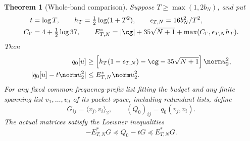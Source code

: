 \documentclass[11pt,a4paper]{article}
\numberwithin{equation}{section}
\newtheorem{theorem}{Theorem}[section]
\theoremstyle{definition}\newtheorem{definition}[theorem]{Definition}
\theoremstyle{remark}\newtheorem{remark}[theorem]{Remark}
\begin{document}
\begin{theorem}[Whole-band comparison]\label{sw:thm:aggregate}
Suppose $T\ge\max(1,2b_N)$, and put
\begin{equation}\label{sw:eq:aggregate-constants}
 \begin{split}
 t&=\log T,\qquad h_T=\tfrac12\log(1+T^2),\qquad
 \epsilon_{T,N}=16b_N^2/T^2,\\
 C_\Gamma&=4+\tfrac12\log37,\qquad
 E^*_{T,N}=|\cg|+35\sqrt{N+1}+\max(C_\Gamma,\epsilon_{T,N}h_T).
 \end{split}
\end{equation}
Then
\begin{align}
 q_0[u]&\ge\left[h_T(1-\epsilon_{T,N})-\cg-35\sqrt{N+1}\right]\norm u_2^2,\label{sw:eq:aggregate-lower}\\
 |q_0[u]-t\norm u_2^2|&\le E^*_{T,N}\norm u_2^2.\label{sw:eq:aggregate-error}
\end{align}
For any fixed common frequency-prefix list fitting the budget and any finite spanning list $v_1,\ldots,v_d$ of its packet space, including redundant lists, define
\begin{equation}\label{sw:eq:aggregate-matrices}
 G_{ij}=\langle v_j,v_i\rangle_2,\qquad
 (Q_0)_{ij}=q_0(v_j,v_i).
\end{equation}
The actual matrices satisfy the Loewner inequalities
\begin{equation}\label{sw:eq:loewner}
 -E^*_{T,N}G\preceq Q_0-tG\preceq E^*_{T,N}G.
\end{equation}
\end{theorem}
\end{document}

